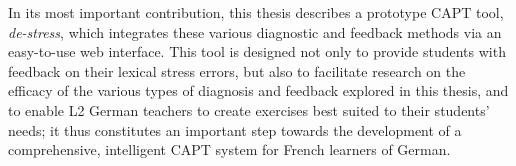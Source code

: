 In its most important contribution, this thesis describes a prototype CAPT tool, \textit{de-stress},
which integrates these various diagnostic and feedback methods via an easy-to-use web interface. 
This tool is designed not only to provide students with feedback on their lexical stress errors, but also to facilitate research on the efficacy of the various
 types of diagnosis and feedback
 explored in this thesis, and to enable L2 German teachers 
 to create exercises best suited to their students' needs; it thus constitutes an important step towards the development of a comprehensive, intelligent CAPT system for French learners of German. 




\vspace*{20mm}

%
